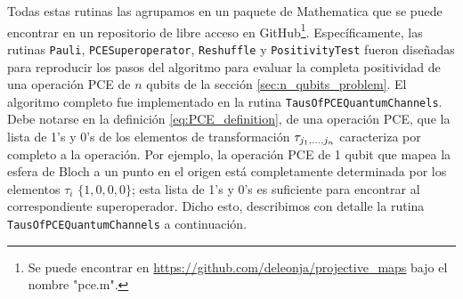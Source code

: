 Todas estas rutinas las agrupamos en un paquete de Mathematica
que se puede encontrar en un repositorio de libre acceso en 
GitHub\footnote{Se puede encontrar en 
\href{https://github.com/deleonja/projective_maps}
{https://github.com/deleonja/projective\_maps} bajo 
el nombre "pce.m".}. Específicamente, las rutinas 
\texttt{Pauli}, \texttt{PCESuperoperator}, \texttt{Reshuffle} y 
\texttt{PositivityTest} fueron diseñadas para reproducir los pasos 
del algoritmo para evaluar la completa positividad de una operación 
PCE de $n$ qubits de la sección \ref{sec:n_qubits_problem}.
El algoritmo completo fue implementado en la rutina 
\texttt{TausOfPCEQuantumChannels}. Debe notarse en la definición 
\eqref{eq:PCE_definition}, de una operación PCE, que la lista de
1's y 0's de los elementos de transformación $\tau_{j_1,\ldots ,j_n}$ caracteriza 
por completo a la operación. Por ejemplo, la operación PCE de 1 qubit 
que mapea la esfera de Bloch a un punto en el origen
está completamente determinada por 
los elementos $\tau_i$ $\{1,0,0,0\}$; esta lista de 
1's y 0's es suficiente para encontrar al correspondiente superoperador.
Dicho esto, describimos con detalle la rutina 
\texttt{TausOfPCEQuantumChannels} a continuación.

%

